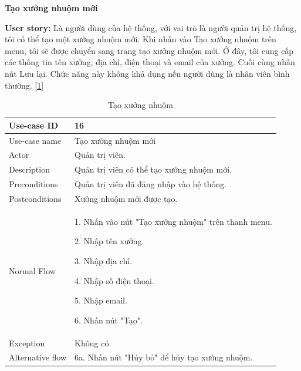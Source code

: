 \newpage
\textbf{Tạo xưởng nhuộm mới}\par
\textbf{User story:} Là người dùng của hệ thống, với vai trò là người quản trị hệ thống, tôi có thể tạo một xưởng nhuộm mới. Khi nhấn vào Tạo xưởng nhuộm trên menu, tôi sẽ được chuyển sang trang tạo xưởng nhuộm mới. Ở đây, tôi cung cấp các thông tin tên xưởng, địa chỉ, điện thoại và email của xưởng. Cuối cùng nhấn nút Lưu lại. Chức năng này không khả dụng nếu người dùng là nhân viên bình thường. [\ref{bang16}]
\begin{table}[!htp]
    \centering
    \begin{tabular}{|m{3cm}|m{10cm}|}
    \hline 
        Use-case ID & 16\\ \hline
        Use-case name & Tạo xưởng nhuộm mới\\ \hline
        Actor & Quản trị viên.\\ \hline
        Description & Quản trị viên có thể tạo xưởng nhuộm mới.\\ \hline
        Preconditions & Quản trị viên đã đăng nhập vào hệ thống.\\ \hline
        Postconditions & Xưởng nhuộm mới được tạo.\\ \hline
        Normal Flow & 
        1. Nhấn vào nút "Tạo xưởng nhuộm" trên thanh menu.\par 
        2. Nhập tên xưởng.\par
        3. Nhập địa chỉ.\par
        4. Nhập số điện thoại.\par
        5. Nhập email.\par
        6. Nhấn nút "Tạo".
        \\ \hline
        Exception & Không có.
        \\ \hline
        Alternative flow & 
        6a. Nhấn nút "Hủy bỏ" để hủy tạo xưởng nhuộm.
        \\ 
    \hline 
    \end{tabular}
    \caption{Tạo xưởng nhuộm}
    \label{bang16}
\end{table}

